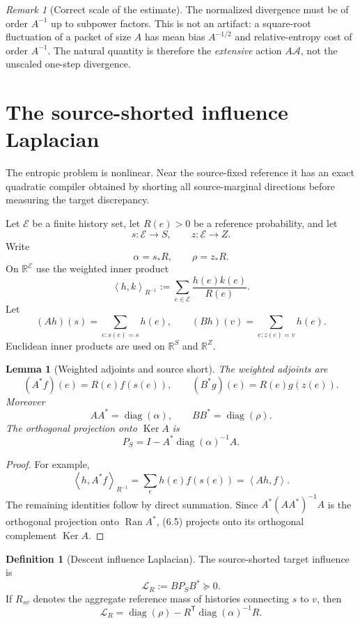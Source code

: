 \documentclass[11pt]{article}
\newtheorem{lemma}[theorem]{Lemma}
\theoremstyle{definition}
\newtheorem{definition}[theorem]{Definition}
\theoremstyle{remark}
\newtheorem{remark}[theorem]{Remark}
\newcommand{\R}{\mathbb R}
\newcommand{\Ker}{\operatorname{Ker}}
\newcommand{\Ran}{\operatorname{Ran}}
\newcommand{\diag}{\operatorname{diag}}
\newcommand{\ip}[2]{\left\langle#1,#2\right\rangle}
\begin{document}
\begin{remark}[Correct scale of the estimate]
The normalized divergence must be of order $A^{-1}$ up to subpower factors.
This is not an artifact: a square-root fluctuation of a packet of size $A$
has mean bias $A^{-1/2}$ and relative-entropy cost of order $A^{-1}$.  The
natural quantity is therefore the \emph{extensive} action
$A\mathcal A$, not the unscaled one-step divergence.
\end{remark}

\section{The source-shorted influence Laplacian}
\label{sec:influence}

The entropic problem is nonlinear.  Near the source-fixed reference it has an
exact quadratic compiler obtained by shorting all source-marginal directions
before measuring the target discrepancy.

Let $\mathcal E$ be a finite history set, let $R(e)>0$ be a reference
probability, and let
\[
 s:\mathcal E\to S,
 \qquad
 z:\mathcal E\to Z.
\]
Write
\[
 \alpha=s_*R,
 \qquad
 \rho=z_*R.
\]
On $\R^{\mathcal E}$ use the weighted inner product
\[
 \ip{h}{k}_{R^{-1}}
 :=\sum_{e\in\mathcal E}\frac{h(e)k(e)}{R(e)}.
 \tag{6.1}
\]
Let
\[
 (Ah)(s)=\sum_{e:s(e)=s}h(e),
 \qquad
 (Bh)(v)=\sum_{e:z(e)=v}h(e).
 \tag{6.2}
\]
Euclidean inner products are used on $\R^S$ and $\R^Z$.

\begin{lemma}[Weighted adjoints and source short]
\label{lem:weighted-adjoints}
The weighted adjoints are
\[
 (A^*f)(e)=R(e)f(s(e)),
 \qquad
 (B^*g)(e)=R(e)g(z(e)).
 \tag{6.3}
\]
Moreover
\[
 AA^*=\diag(\alpha),
 \qquad
 BB^*=\diag(\rho).
 \tag{6.4}
\]
The orthogonal projection onto $\Ker A$ is
\[
 \boxed{
 P_S=I-A^*\diag(\alpha)^{-1}A.}
 \tag{6.5}
\]
\end{lemma}

\begin{proof}
For example,
\[
 \ip{h}{A^*f}_{R^{-1}}
 =\sum_eh(e)f(s(e))
 =\ip{Ah}{f}.
\]
The remaining identities follow by direct summation.  Since
$A^*(AA^*)^{-1}A$ is the orthogonal projection onto $\Ran A^*$,
\textup{(6.5)} projects onto its orthogonal complement $\Ker A$.
\end{proof}

\begin{definition}[Descent influence Laplacian]
The source-shorted target influence is
\[
 \boxed{
 \mathcal L_R:=BP_SB^*\succeq0.}
 \tag{6.6}
\]
If $R_{sv}$ denotes the aggregate reference mass of histories connecting
$s$ to $v$, then
\[
 \boxed{
 \mathcal L_R
 =\diag(\rho)-R^\mathsf T\diag(\alpha)^{-1}R.}
 \tag{6.7}
\]
\end{definition}
\end{document}

